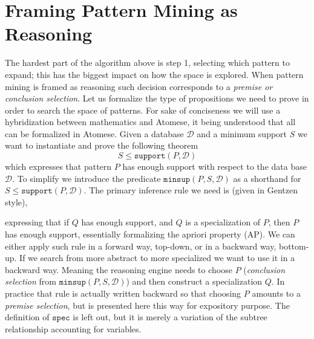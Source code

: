 \documentclass[runningheads]{llncs}
\begin{document}
\section{Framing Pattern Mining as Reasoning}
\label{FPMR}

The hardest part of the algorithm above is step 1, selecting which
pattern to expand; this has the biggest impact on how the space is
explored. When pattern mining is framed as reasoning such decision
corresponds to a \emph{premise or conclusion selection}. Let us
formalize the type of propositions we need to prove in order to search
the space of patterns. For sake of conciseness we will use a
hybridization between mathematics and Atomese, it being understood
that all can be formalized in Atomese.  Given a database $\mathcal{D}$
and a minimum support $S$ we want to instantiate and prove the
following theorem
$$ S \le \texttt{support}(P, \mathcal{D}) $$ which expresses that
pattern $P$ has enough support with respect to the data base
$\mathcal{D}$.
To simplify we introduce the predicate $
\texttt{minsup}(P, S, \mathcal{D})$ as a shorthand for $S \le
\texttt{support}(P, \mathcal{D}) $.
The primary inference rule we
need is (given in Gentzen style),
\begin{prooftree}
\end{prooftree}
expressing that if $Q$ has enough support, and $Q$ is a specialization
of $P$, then $P$ has enough support, essentially formalizing the
apriori property (AP). We can either apply such rule in a forward way,
top-down, or in a backward way, bottom-up. If we search from more
abstract to more specialized we want to use it in a backward
way. Meaning the reasoning engine needs to choose $P$
(\emph{conclusion selection} from $\texttt{minsup}(P, S,
\mathcal{D})$) and then construct a specialization $Q$.  In practice
that rule is actually written backward so that choosing $P$ amounts to
a \emph{premise selection}, but is presented here this way for
expository purpose.  The definition of $\texttt{spec}$ is left out,
but it is merely a variation of the subtree relationship accounting
for variables.
\end{document}
